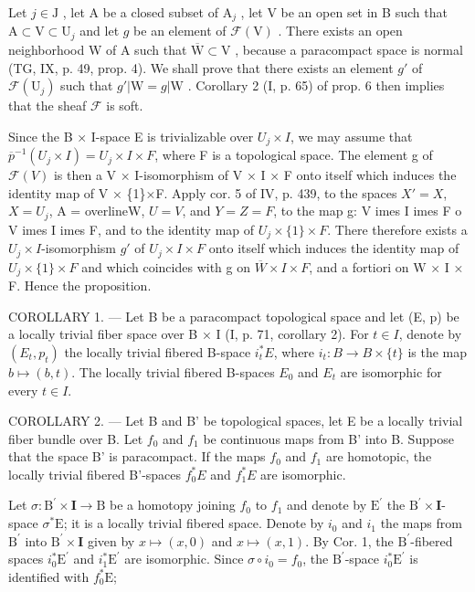Let \(j \in \mathrm{J}\) , let A be a closed subset of \(\mathrm{A}_j\) , let V be an open set in B such that \(\mathrm{A} \subset \mathrm{V} \subset \mathrm{U}_j\) and let \(g\) be an element of \(\mathcal{F}(\mathrm{V})\) . There exists an open neighborhood W of A such that \(\overline{\mathrm{W}} \subset \mathrm{V}\) , because a paracompact space is normal (TG, IX, p. 49, prop. 4). We shall prove that there exists an element \(g'\) of \(\mathcal{F}(\mathrm{U}_j)\) such that \(g' | \mathrm{W} = g | \mathrm{W}\) . Corollary 2 (I, p. 65) of prop. 6 then implies that the sheaf \(\mathcal{F}\) is soft.

Since the B × I-space E is trivializable over \(U_{j} \times I\), we may assume that \(\overline{p}^{-1}(U_{j} \times I) = U_{j} \times I \times F\), where F is a topological space. The element g of \(\mathcal{F}(V)\) is then a V × I-isomorphism of V × I × F onto itself which induces the identity map of V × \{1\}×F. Apply cor. 5 of IV, p. 439, to the spaces \(X' = X\), \(X = U_{j}\), A = overline{W}, \(U = V\), and \(Y = Z = F\), to the map g: V 	imes I 	imes F 	o V 	imes I 	imes F, and to the identity map of \(U_{j} \times \{1\} \times F\). There therefore exists a \(U_{j} \times I\)-isomorphism \(g'\) of \(U_{j} \times I \times F\) onto itself which induces the identity map of \(U_{j} \times \{1\} \times F\) and which coincides with g on \(\overline{W} \times I \times F\), and a fortiori on W × I × F. Hence the proposition.

COROLLARY 1. --- Let B be a paracompact topological space and let (E, p) be a locally trivial fiber space over B × I (I, p. 71, corollary 2). For \(t \in I\), denote by \((E_{t}, p_{t})\) the locally trivial fibered B-space \(i_{t}^{*}E\), where \(i_{t} \colon B \to B \times \{t\}\) is the map \(b \mapsto (b, t)\). The locally trivial fibered B-spaces \(E_{0}\) and \(E_{t}\) are isomorphic for every \(t \in I\).

COROLLARY 2. --- Let B and B' be topological spaces, let E be a locally trivial fiber bundle over B. Let \(f_0\) and \(f_1\) be continuous maps from B' into B. Suppose that the space B' is paracompact. If the maps \(f_0\) and \(f_1\) are homotopic, the locally trivial fibered B'-spaces \(f_0^*E\) and \(f_1^*E\) are isomorphic.

Let \(\sigma\colon\mathrm{B}^{\prime}\times\mathbf{I}\to\mathrm{B}\) be a homotopy joining \(f_{0}\) to \(f_{1}\) and denote by \(\mathrm{E}^{\prime}\) the \(\mathrm{B}^{\prime}\times\mathbf{I}\)-space \(\sigma^{*}\mathrm{E}\); it is a locally trivial fibered space. Denote by \(i_{0}\) and \(i_{1}\) the maps from \(\mathrm{B}^{\prime}\) into \(\mathrm{B}^{\prime}\times\mathbf{I}\) given by \(x\mapsto(x,0)\) and \(x\mapsto(x,1)\). By Cor. 1, the \(\mathrm{B}^{\prime}\)-fibered spaces \(i_{0}^{*}\mathrm{E}^{\prime}\) and \(i_{1}^{*}\mathrm{E}^{\prime}\) are isomorphic. Since \(\sigma\circ i_{0}=f_{0}\), the \(\mathrm{B}^{\prime}\)-space \(i_{0}^{*}\mathrm{E}^{\prime}\) is identified with \(f_{0}^{*}\mathrm{E}\);

